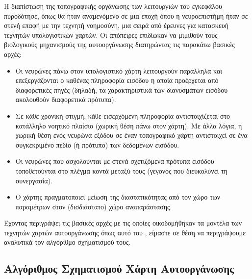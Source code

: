 Η διαπίστωση της τοπογραφικής οργάνωσης των λειτουργιών του εγκεφάλου πυροδότησε, όπως θα ήταν αναμενόμενο σε μια εποχή όπου η νευροεπιστήμη ήταν σε στενή επαφή με την τεχνητή νοημοσύνη, μια σειρά από έρευνες για κατασκευή τεχνητών υπολογιστικών χαρτών. Οι απόπειρες επιδίωκαν να μιμιθούν τους βιολογικούς μηχανισμούς της αυτο\textendash οργάνωσης διατηρώντας τις παρακάτω βασικές αρχές:
\begin{itemize}
  \item Οι νευρώνες πάνω στον υπολογιστικό χάρτη λειτουργούν παράλληλα και επεξεργάζονται ο καθένας πληροφορία εισόδου η οποία προέρχεται από διαφορετικές πηγές (δηλαδή, τα χαρακτηριστικά των διανυσμάτων εισόδου ακολουθούν διαφορετικά πρότυπα).
  \item Σε κάθε χρονική στιγμή, κάθε εισερχόμενη πληροφορία αντιστοιχίζεται στο κατάλληλο νοητικό πλαίσιο (χωρική θέση πάνω στον χάρτη). Με άλλα λόγια, η χωρική θέση ενός νευρώνα εξόδου σε έναν τοπογραφικό χάρτη αντιστοιχεί σε ένα συγκεκριμένο πεδίο (ή πρότυπο) των δεδομένων εισόδου\cite{kohonen1990self}.
  \item Οι νευρώνες που ασχολούνται με στενά σχετιζόμενα πρότυπα εισόδου τοποθετούνται στο πλέγμα κοντά μεταξύ τους (γεγονός που διευκολύνει τη συνεργασία).
  \item Ο χάρτης πραγματοποιεί μείωση της διαστατικότητας από τον χώρο των παραμέτρων στον (δισδιάστατο) χώρο αναπαράστασης.\cite{haykin2009neural, knudsen1987computational, durbin1990dimension}
\end{itemize} 
Έχοντας περιγράψει τις βασικές αρχές με τις οποίες οικοδομήθηκαν τα μοντέλα των τεχνητών χαρτών αυτο\textendash οργάνωσης όπως αυτό του , είμαστε σε θέση να περιγράψουμε αναλυτικά τον αλγόριθμο σχηματισμού τους.

\subsection{Αλγόριθμος Σχηματισμού Χάρτη Αυτο\textendash οργάνωσης}

